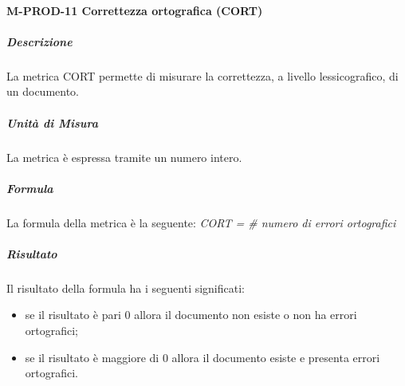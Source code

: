 		\paragraph{M-PROD-11 Correttezza ortografica (CORT)}
			\subparagraph{Descrizione}
			La metrica CORT permette di misurare la correttezza, a livello lessicografico, di un documento.
			\subparagraph{Unità di Misura}
				La metrica è espressa tramite un numero intero.
			\subparagraph{Formula}
				La formula della metrica è la seguente:
				\textit{CORT = \# numero di errori ortografici}
			\subparagraph{Risultato}
				Il risultato della formula ha i seguenti significati:
				\begin{itemize}
					\item se il risultato è pari 0 allora il documento non esiste o non ha errori ortografici;
					\item se il risultato è maggiore di 0 allora il documento esiste e presenta errori ortografici.
				\end{itemize}

